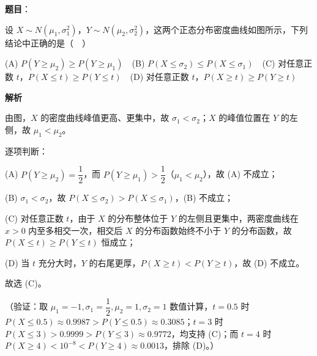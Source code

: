 \begin{answer}

\textbf{题目}：

设 \(X\sim N(\mu_1,\sigma_1^2)\)，\(Y\sim N(\mu_2,\sigma_2^2)\)，这两个正态分布密度曲线如图所示，下列结论中正确的是（　）
\nopagebreak[4]
\begin{center}\end{center}
\nopagebreak[4]
(A) \(P(Y\geqslant\mu_2)\geqslant P(Y\geqslant\mu_1)\)　(B) \(P(X\leqslant\sigma_2)\leqslant P(X\leqslant\sigma_1)\)　(C) 对任意正数 \(t\)，\(P(X\leqslant t)\geqslant P(Y\leqslant t)\)　(D) 对任意正数 \(t\)，\(P(X\geqslant t)\geqslant P(Y\geqslant t)\)

\textbf{解析}

由图，\(X\) 的密度曲线峰值更高、更集中，故 \(\sigma_1<\sigma_2\)；\(X\) 的峰值位置在 \(Y\) 的左侧，故 \(\mu_1<\mu_2\)。

逐项判断：

(A) \(P(Y\geqslant\mu_2)=\dfrac12\)，而 \(P(Y\geqslant\mu_1)>\dfrac12\)（\(\mu_1<\mu_2\)），故 (A) 不成立；

(B) \(\sigma_1<\sigma_2\)，故 \(P(X\leqslant\sigma_2)>P(X\leqslant\sigma_1)\)，(B) 不成立；

(C) 对任意正数 \(t\)，由于 \(X\) 的分布整体位于 \(Y\) 的左侧且更集中，两密度曲线在 \(x>0\) 内至多相交一次，相交后 \(X\) 的分布函数始终不小于 \(Y\) 的分布函数，故 \(P(X\leqslant t)\geqslant P(Y\leqslant t)\) 恒成立；

(D) 当 \(t\) 充分大时，\(Y\) 的右尾更厚，\(P(X\geqslant t)<P(Y\geqslant t)\)，故 (D) 不成立。

故选 (C)。

（验证：取 \(\mu_1=-1,\sigma_1=\dfrac12,\mu_2=1,\sigma_2=1\) 数值计算，\(t=0.5\) 时 \(P(X\leqslant0.5)\approx0.9987>P(Y\leqslant0.5)\approx0.3085\)；\(t=3\) 时 \(P(X\leqslant3)>0.9999>P(Y\leqslant3)\approx0.9772\)，均支持 (C)；而 \(t=4\) 时 \(P(X\geqslant4)<10^{-8}<P(Y\geqslant4)\approx0.0013\)，排除 (D)。）


\end{answer}
